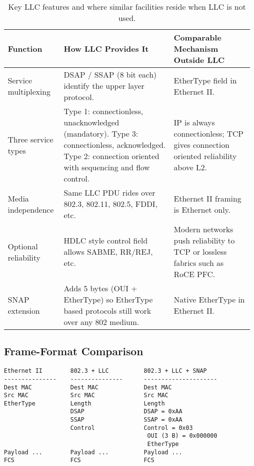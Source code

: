 \begin{table}[h]
\centering
\footnotesize
\begin{tabular}{@{}p{3cm}p{6cm}p{5cm}@{}}
\toprule
\textbf{Function} & \textbf{How LLC Provides It} & \textbf{Comparable Mechanism Outside LLC} \\
\midrule
Service multiplexing & DSAP / SSAP (8 bit each) identify the upper layer protocol. & EtherType field in Ethernet II. \\
Three service types & Type 1: connectionless, unacknowledged (mandatory).  Type 3: connectionless, acknowledged.  Type 2: connection oriented with sequencing and flow control. & IP is always connectionless; TCP gives connection oriented reliability above L2. \\
Media independence & Same LLC PDU rides over 802.3, 802.11, 802.5, FDDI, etc. & Ethernet II framing is Ethernet only. \\
Optional reliability & HDLC style control field allows SABME, RR/REJ, etc. & Modern networks push reliability to TCP or lossless fabrics such as RoCE PFC. \\
SNAP extension & Adds 5 bytes (OUI + EtherType) so EtherType based protocols still work over any 802 medium. & Native EtherType in Ethernet II. \\
\bottomrule
\end{tabular}
\caption{Key LLC features and where similar facilities reside when LLC is not used.}
\end{table}

\subsection{Frame-Format Comparison}

\begin{verbatim}
Ethernet II        802.3 + LLC          802.3 + LLC + SNAP
---------------    ---------------      ---------------------
Dest MAC           Dest MAC             Dest MAC
Src MAC            Src MAC              Src MAC
EtherType          Length               Length
                   DSAP                 DSAP = 0xAA
                   SSAP                 SSAP = 0xAA
                   Control              Control = 0x03
                                         OUI (3 B) = 0x000000
                                         EtherType
Payload ...        Payload ...          Payload ...
FCS                FCS                  FCS
\end{verbatim}

